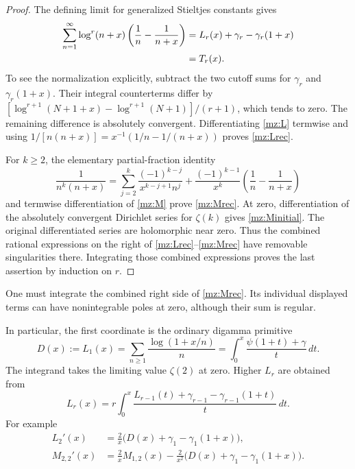 \begin{proof}
The defining limit for generalized Stieltjes constants gives
\begin{align}
 \sum_{n=1}^{\infty}\log^r(n+x)
          \left(\frac1n-\frac1{n+x}\right)
 &=L_r(x)+\gamma_r-\gamma_r(1+x)\notag\\
 &=T_r(x).
 \label{mz:Tsum}
\end{align}
To see the normalization explicitly, subtract the two cutoff sums for
$\gamma_r$ and $\gamma_r(1+x)$. Their integral counterterms differ by
$[\log^{r+1}(N+1+x)-\log^{r+1}(N+1)]/(r+1)$, which tends to zero.
The remaining difference is absolutely convergent. Differentiating
\eqref{mz:L} termwise and using
$1/[n(n+x)]=x^{-1}(1/n-1/(n+x))$ proves \eqref{mz:Lrec}.

For $k\ge2$, the elementary partial-fraction identity
\begin{equation}
 \frac1{n^k(n+x)}
 =\sum_{j=2}^{k}\frac{(-1)^{k-j}}{x^{k-j+1}n^j}
   +\frac{(-1)^{k-1}}{x^k}
          \left(\frac1n-\frac1{n+x}\right)
 \label{mz:partial}
\end{equation}
and termwise differentiation of \eqref{mz:M} prove \eqref{mz:Mrec}.
At zero, differentiation of the absolutely convergent Dirichlet series
for $\zeta(k)$ gives \eqref{mz:Minitial}. The original differentiated
series are holomorphic near zero. Thus the combined rational expressions
on the right of \eqref{mz:Lrec}--\eqref{mz:Mrec} have removable
singularities there. Integrating those combined expressions proves the
last assertion by induction on $r$.
\end{proof}

One must integrate the combined right side of \eqref{mz:Mrec}. Its
individual displayed terms can have nonintegrable poles at zero, although
their sum is regular.

In particular, the first coordinate is the ordinary digamma primitive
\begin{equation}
 D(x):=L_1(x)
 =\sum_{n\ge1}\frac{\log(1+x/n)}n
 =\int_0^x\frac{\psi(1+t)+\gamma}{t}\,dt.
 \label{mz:D}
\end{equation}
The integrand takes the limiting value $\zeta(2)$ at zero. Higher $L_r$
are obtained from
\[
 L_r(x)=r\int_0^x
       \frac{L_{r-1}(t)+\gamma_{r-1}-\gamma_{r-1}(1+t)}t\,dt.
\]
For example
\begin{align}
 L_2'(x)&=\frac2x\bigl(D(x)+\gamma_1-\gamma_1(1+x)\bigr),\\
 M_{2,2}'(x)
 &=\frac2xM_{1,2}(x)
   -\frac2{x^2}\bigl(D(x)+\gamma_1-\gamma_1(1+x)\bigr).
\end{align}


